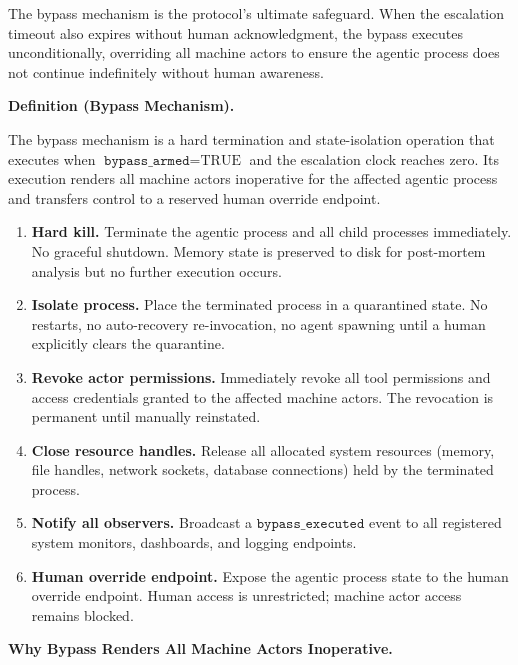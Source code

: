 The bypass mechanism is the protocol's ultimate safeguard. When the escalation timeout also expires without human acknowledgment, the bypass executes unconditionally, overriding all machine actors to ensure the agentic process does not continue indefinitely without human awareness.

\bigskip

\noindent\textbf{Definition (Bypass Mechanism).}

The bypass mechanism is a hard termination and state-isolation operation that executes when $\texttt{bypass\_armed} = \text{TRUE}$ and the escalation clock reaches zero. Its execution renders all machine actors inoperative for the affected agentic process and transfers control to a reserved human override endpoint.

\bigskip

\begin{algorithm}
\caption{Bypass Execution}
\label{alg:bypass}
\begin{enumerate}
  \item \textbf{Hard kill.} Terminate the agentic process and all child processes immediately. No graceful shutdown. Memory state is preserved to disk for post-mortem analysis but no further execution occurs.
  \item \textbf{Isolate process.} Place the terminated process in a quarantined state. No restarts, no auto-recovery re-invocation, no agent spawning until a human explicitly clears the quarantine.
  \item \textbf{Revoke actor permissions.} Immediately revoke all tool permissions and access credentials granted to the affected machine actors. The revocation is permanent until manually reinstated.
  \item \textbf{Close resource handles.} Release all allocated system resources (memory, file handles, network sockets, database connections) held by the terminated process.
  \item \textbf{Notify all observers.} Broadcast a $\texttt{bypass\_executed}$ event to all registered system monitors, dashboards, and logging endpoints.
  \item \textbf{Human override endpoint.} Expose the agentic process state to the human override endpoint. Human access is unrestricted; machine actor access remains blocked.
\end{enumerate}
\end{algorithm}

\bigskip

\noindent\textbf{Why Bypass Renders All Machine Actors Inoperative.}

